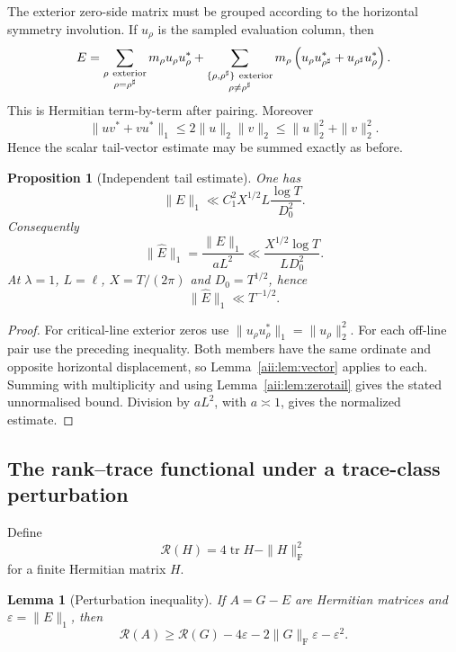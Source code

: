 \documentclass[11pt]{article}
\newtheorem{proposition}[theorem]{Proposition}
\newtheorem{lemma}[theorem]{Lemma}
\DeclareMathOperator{\tr}{tr}
\newcommand{\Frob}{\mathrm F}
\begin{document}
The exterior zero-side matrix must be grouped according to the
horizontal symmetry involution.  If $u_\rho$ is the sampled evaluation column,
then
\[
 E=
 \sum_{\substack{\rho\ {\rm exterior}\\ \rho=\rho^\sharp}}
 m_\rho u_\rho u_\rho^*
 +
 \sum_{\substack{\{\rho,\rho^\sharp\}\ {\rm exterior}\\
                  \rho\ne\rho^\sharp}}
 m_\rho\left(
 u_\rho u_{\rho^\sharp}^*
 +
 u_{\rho^\sharp}u_\rho^*
 \right).
\]
This is Hermitian term-by-term after pairing.  Moreover
\[
 \|uv^*+vu^*\|_1
 \le2\|u\|_2\|v\|_2
 \le\|u\|_2^2+\|v\|_2^2.
\]
Hence the scalar tail-vector estimate may be summed exactly as before.

\begin{proposition}[Independent tail estimate]\label{aii:prop:tail}
One has
\[
 \|E\|_1
 \ll
 C_1^2X^{1/2}L\frac{\log T}{D_0^2}.
\]
Consequently
\[
 \|\widehat E\|_1
 =
 \frac{\|E\|_1}{aL^2}
 \ll
 \frac{X^{1/2}\log T}{LD_0^2}.
\]
At $\lambda=1$, $L=\ell$, $X=T/(2\pi)$ and $D_0=T^{1/2}$, hence
\[
 \boxed{\|\widehat E\|_1\ll T^{-1/2}}.
\]
\end{proposition}

\begin{proof}
For critical-line exterior zeros use
$\|u_\rho u_\rho^*\|_1=\|u_\rho\|_2^2$.
For each off-line pair use the preceding inequality.  Both members have the
same ordinate and opposite horizontal displacement, so
Lemma~\ref{aii:lem:vector} applies to each.  Summing with multiplicity and using
Lemma~\ref{aii:lem:zerotail} gives the stated unnormalised bound.  Division by
$aL^2$, with $a\asymp1$, gives the normalized estimate.
\end{proof}

\subsection{The rank--trace functional under a trace-class perturbation}

Define
\[
 \mathcal R(H)=4\tr H-\|H\|_{\Frob}^2
\]
for a finite Hermitian matrix $H$.

\begin{lemma}[Perturbation inequality]\label{aii:lem:pert}
If $A=G-E$ are Hermitian matrices and $\varepsilon=\|E\|_1$, then
\begin{equation}\label{aii:eq:pert}
 \mathcal R(A)
 \ge
 \mathcal R(G)
 -
 4\varepsilon
 -
 2\|G\|_{\Frob}\varepsilon
 -
 \varepsilon^2.
\end{equation}
\end{lemma}
\end{document}

